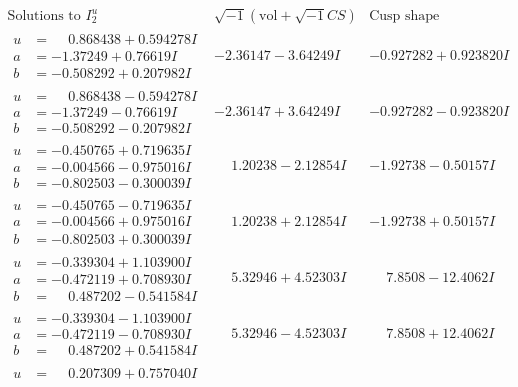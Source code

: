 \documentclass[1p]{elsarticle_modified}
\theoremstyle{definition}
\newcommand{\I}{\sqrt{-1}}
\begin{document}
$$\begin{array}{c|c|c}  
\text{Solutions to }I^u_{2}& \I (\text{vol} + \sqrt{-1}CS) & \text{Cusp shape}\\
 \hline 
\begin{aligned}
u &= \phantom{-}0.868438 + 0.594278 I \\
a &= -1.37249 + 0.76619 I \\
b &= -0.508292 + 0.207982 I\end{aligned}
 & -2.36147 - 3.64249 I & -0.927282 + 0.923820 I \\ \hline\begin{aligned}
u &= \phantom{-}0.868438 - 0.594278 I \\
a &= -1.37249 - 0.76619 I \\
b &= -0.508292 - 0.207982 I\end{aligned}
 & -2.36147 + 3.64249 I & -0.927282 - 0.923820 I \\ \hline\begin{aligned}
u &= -0.450765 + 0.719635 I \\
a &= -0.004566 - 0.975016 I \\
b &= -0.802503 - 0.300039 I\end{aligned}
 & \phantom{-}1.20238 - 2.12854 I & -1.92738 - 0.50157 I \\ \hline\begin{aligned}
u &= -0.450765 - 0.719635 I \\
a &= -0.004566 + 0.975016 I \\
b &= -0.802503 + 0.300039 I\end{aligned}
 & \phantom{-}1.20238 + 2.12854 I & -1.92738 + 0.50157 I \\ \hline\begin{aligned}
u &= -0.339304 + 1.103900 I \\
a &= -0.472119 + 0.708930 I \\
b &= \phantom{-}0.487202 - 0.541584 I\end{aligned}
 & \phantom{-}5.32946 + 4.52303 I & \phantom{-}7.8508 - 12.4062 I \\ \hline\begin{aligned}
u &= -0.339304 - 1.103900 I \\
a &= -0.472119 - 0.708930 I \\
b &= \phantom{-}0.487202 + 0.541584 I\end{aligned}
 & \phantom{-}5.32946 - 4.52303 I & \phantom{-}7.8508 + 12.4062 I \\ \hline\begin{aligned}
u &= \phantom{-}0.207309 + 0.757040 I \\

\end{aligned}
\end{array}$$
\end{document}
